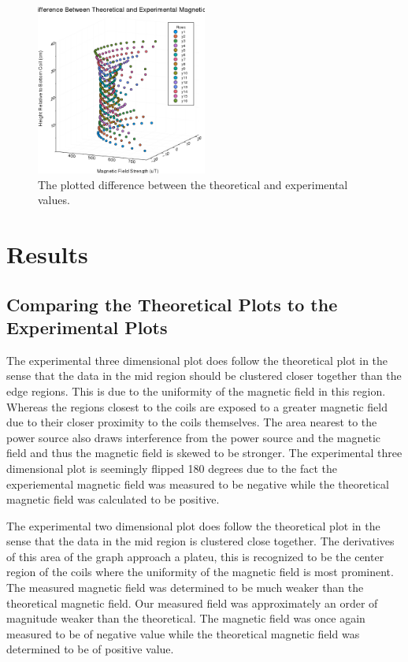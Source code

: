\documentclass[a4paper]{article}
\begin{document}
\begin{figure}[H]
  \begin{center}
    \includegraphics[width=0.5\textwidth]{3DPlotDiff.png}
  \end{center}
  \caption{The plotted difference between the theoretical and experimental
    values.}
  \label{gph:diff}
\end{figure}




\section{Results}
\subsection{Comparing the Theoretical Plots to the Experimental Plots}
\qq The experimental three dimensional plot does follow the theoretical
plot in the sense that the data in the mid region should be clustered
closer together than the edge regions. This is due to the uniformity
of the magnetic field in this region. Whereas the regions closest to
the coils are exposed to a greater magnetic field due to their closer
proximity to the coils themselves. The area nearest to the power
source also draws interference from the power source and the magnetic
field and thus the magnetic field is skewed to be stronger. The
experimental three dimensional plot is seemingly flipped 180 degrees
due to the fact the experiemental magnetic field was measured to be
negative while the theoretical magnetic field was calculated to be
positive.

\qq The experimental two dimensional plot does follow the theoretical plot
in the sense that the data in the mid region is clustered close
together. The derivatives of this area of the graph approach a
plateu, this is recognized to be the center region of the coils where
the uniformity of the magnetic field is most prominent. The measured
magnetic field was determined to be much weaker than the theoretical
magnetic field. Our measured field was approximately an order of
magnitude weaker than the theoretical. The magnetic field was once
again measured to be of negative value while the theoretical magnetic
field was determined to be of positive value.
\end{document}
